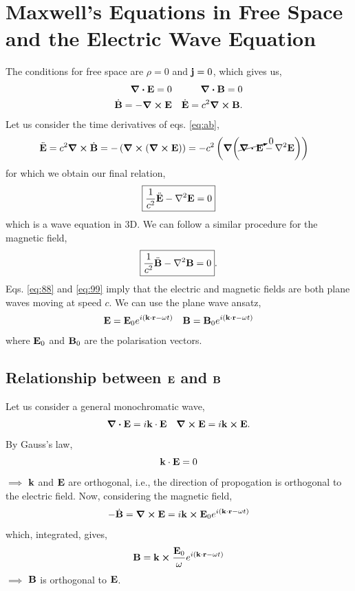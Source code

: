 \documentclass{book}
\begin{document}
\section{Maxwell's Equations in Free Space and the Electric Wave Equation}
The conditions for free space are $\rho =0$ and $\vb{j} = 0$, which gives us,
\begin{align}
	\div{\vb{E}} = 0 && \div{\vb{B}} = 0 \\
	\Dot{\vb{B}} = -\curl{\vb{E}} && \Dot{\vb{E}} = c^2 \curl{\vb{B}} \label{eq:ab}.
\end{align}
Let us consider the time derivatives of eqs. \eqref{eq:ab},
\begin{equation}
	\begin{split}
		\Ddot{\vb{E}} = c^2 \curl{\Dot{\vb{B}}} & = -\left(\curl{(\curl{\vb{E}})}\right) 
		 = -c^2\left(\grad(\cancelto{0}{\div{\vb{E}}} - \laplacian{\vb{E}})\right)
	\end{split}
\end{equation}
for which we obtain our final relation,
\begin{equation}
	\boxed{\frac{1}{c^2}\Ddot{\vb{E}} - \laplacian \vb{E} = 0} \label{eq:88}
\end{equation}
which is a wave equation in 3D. We can follow a similar procedure for the magnetic field,
\begin{equation}
	\boxed{\frac{1}{c^2}\Ddot{\vb{B}} - \laplacian\vb{B} = 0}. \label{eq:99}
\end{equation}
Eqs. \eqref{eq:88} and \eqref{eq:99} imply that the electric and magnetic fields are both plane waves moving at speed $c$. We can use the plane wave ansatz,
\begin{align}
	\vb{E}= \vb{E}_0 e^{i(\vb{k}\cdot\vb{r} - \omega t)} && \vb{B} = \vb{B}_0e^{i(\vb{k}\cdot\vb{r} - \omega t)}
\end{align}
where $\vb{E}_0$ and $\vb{B}_0$ are the polarisation vectors. 
\subsection{Relationship between $\vb{E}$ and $\vb{B}$}
Let us consider a general monochromatic wave,
\begin{align}
	\div{\vb{E}} = i\vb{k}\cdot\vb{E} && \curl{\vb{E}} = i\vb{k}\cross \vb{E}.
\end{align}
By Gauss's law,
\begin{equation}
	\vb{k}\cdot\vb{E} = 0
\end{equation}
$\implies$ $\vb{k}$ and $\vb{E}$ are orthogonal, i.e., the direction of propogation is orthogonal to the electric field. Now, considering the magnetic field,
\begin{equation}
	-\Dot{\vb{B}} = \curl{\vb{E}} = i\vb{k}\cross\vb{E}_0e^{i(\vb{k}\cdot\vb{r} - \omega t)}
\end{equation}
which, integrated, gives,
\begin{equation}
	\vb{B} = \vb{k}\cross \frac{\vb{E}_0}{\omega}e^{i(\vb{k}\cdot{\vb{r}} - \omega t)}
\end{equation}
$\implies$ $\vb{B}$ is orthogonal to $\vb{E}$.
\appendix 
\end{document}
